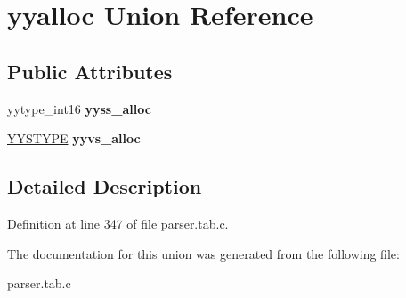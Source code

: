 \hypertarget{unionyyalloc}{\section{yyalloc Union Reference}
\label{unionyyalloc}
}
\subsection*{Public Attributes}
\begin{DoxyCompactItemize}
\item 
\hypertarget{unionyyalloc_a4800e0520a89a4789afa7b5d82197e65}{yytype\-\_\-int16 {\bfseries yyss\-\_\-alloc}}\label{unionyyalloc_a4800e0520a89a4789afa7b5d82197e65}

\item 
\hypertarget{unionyyalloc_a9326f4fdc6f737a929444427836d8928}{\hyperlink{unionYYSTYPE}{Y\-Y\-S\-T\-Y\-P\-E} {\bfseries yyvs\-\_\-alloc}}\label{unionyyalloc_a9326f4fdc6f737a929444427836d8928}

\end{DoxyCompactItemize}


\subsection{Detailed Description}


Definition at line 347 of file parser.\-tab.\-c.



The documentation for this union was generated from the following file\-:\begin{DoxyCompactItemize}
\item 
parser.\-tab.\-c\end{DoxyCompactItemize}

